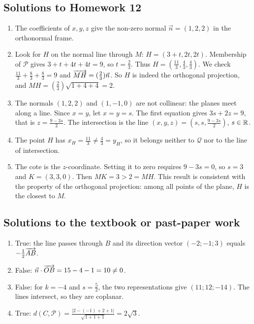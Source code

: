 \subsection{Solutions to Homework 12}\begin{enumerate}
\item The coefficients of $x,y,z$ give the non-zero normal $\vec n=(1,2,2)$ in the orthonormal frame.
\item Look for $H$ on the normal line through $M$: $H=(3+t,2t,2t)$. Membership of $\mathcal P$ gives $3+t+4t+4t=9$, so $t=\frac{2}{3}$. Thus $H=(\frac{11}{3},\frac{4}{3},\frac{4}{3})$. We check $\frac{11}{3}+\frac{8}{3}+\frac{8}{3}=9$ and $\overrightarrow{MH}=(\frac{2}{3})\vec{n}$. So $H$ is indeed the orthogonal projection, and $MH=(\frac{2}{3})\sqrt{1+4+4}=2$.
\item The normals $(1,2,2)$ and $(1,-1,0)$ are not collinear: the planes meet along a line. Since $x=y$, let $x=y=s$. The first equation gives $3s+2z=9$, that is $z=\frac{9-3s}{2}$. The intersection is the line $(x,y,z)=(s,s,\frac{9-3s}{2})$, $s\in\mathbb R$.
\item The point $H$ has $x_H=\frac{11}{3}\ne\frac{4}{3}=y_H$, so it belongs neither to $\mathcal Q$ nor to the line of intersection.
\item The cote is the $z$-coordinate. Setting it to zero requires $9-3s=0$, so $s=3$ and $K=(3,3,0)$. Then $MK=3>2=MH$. This result is consistent with the property of the orthogonal projection: among all points of the plane, $H$ is the closest to $M$.
\end{enumerate}

\subsection{Solutions to the textbook or past-paper work}\begin{enumerate}
\item True: the line passes through $B$ and its direction vector $(-2;-1;3)$ equals $-\frac12\overrightarrow{AB}$.
\item False: $\vec n\cdot\overrightarrow{OB}=15-4-1=10\ne0$.
\item False: for $k=-4$ and $s=\frac52$, the two representations give $(11;12;-14)$. The lines intersect, so they are coplanar.
\item True: $d(C,\mathcal P)=\frac{|2-(-1)+2+1|}{\sqrt{1+1+1}}=2\sqrt3$.
\end{enumerate}

\fi

